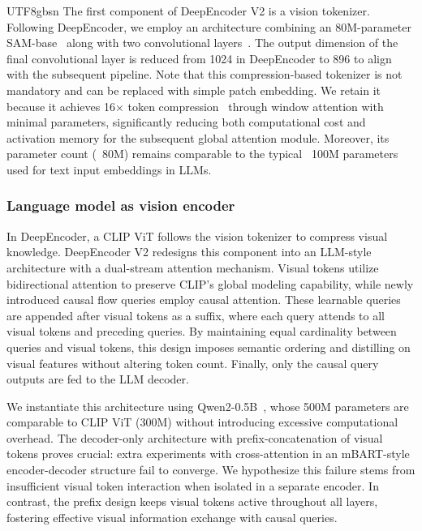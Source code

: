 \documentclass[11pt, a4paper, logo, copyright, nonumbering]{deepseek}
\begin{document}
\begin{CJK*}{UTF8}{gbsn}
The first component of DeepEncoder V2 is a vision tokenizer. Following DeepEncoder, we employ an architecture combining an 80M-parameter SAM-base~\cite{kirilloV2023segment} along with two convolutional layers~\cite{wei2024vary}. The output dimension of the final convolutional layer is reduced from 1024 in DeepEncoder to 896 to align with the subsequent pipeline. Note that this compression-based tokenizer is not mandatory and can be replaced with simple patch embedding. We retain it because it achieves 16$\times$ token compression~\cite{wei2024general,wang2025step,wei2024small,huang2026step3} through window attention with minimal parameters, significantly reducing both computational cost and activation memory for the subsequent global attention module. Moreover, its parameter count (~80M) remains comparable to the typical ~100M parameters used for text input embeddings in LLMs.

\subsubsection{Language model as vision encoder}
In DeepEncoder, a CLIP ViT follows the vision tokenizer to compress visual knowledge. DeepEncoder V2 redesigns this component into an LLM-style architecture with a dual-stream attention mechanism. Visual tokens utilize bidirectional attention to preserve CLIP's global modeling capability, while newly introduced causal flow queries employ causal attention. These learnable queries are appended after visual tokens as a suffix, where each query attends to all visual tokens and preceding queries. By maintaining equal cardinality between queries and visual tokens, this design imposes semantic ordering and distilling on visual features without altering token count. Finally, only the causal query outputs are fed to the LLM decoder.

We instantiate this architecture using Qwen2-0.5B~\cite{wang2024qwen2}, whose 500M parameters are comparable to CLIP ViT (300M) without introducing excessive computational overhead. The decoder-only architecture with prefix-concatenation of visual tokens proves crucial: extra experiments with cross-attention in an mBART-style~\cite{liu2020multilingual} encoder-decoder structure fail to converge. We hypothesize this failure stems from insufficient visual token interaction when isolated in a separate encoder. In contrast, the prefix design keeps visual tokens active throughout all layers, fostering effective visual information exchange with causal queries.


\end{CJK*}
\end{document}
